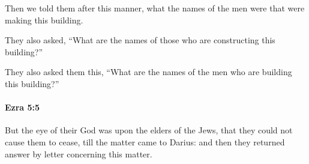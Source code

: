 			\begin{versebox}
					\item[BHS] 
					\item[LXX] 
					\item[ASV] Then we told them after this manner, what the names of the men were that were making this building.
					\item[NIV] They also asked, “What are the names of those who are constructing this building?”
					\item[NRSV] They also asked them this, “What are the names of the men who are building this building?”
			\end{versebox}

		\paragraph{Ezra 5:5} %
			\label{EZRA-5-5}

			But the eye of their God was upon the elders of the Jews, that they could not cause them to cease, till the matter came to Darius: and then they returned answer by letter concerning this matter.

